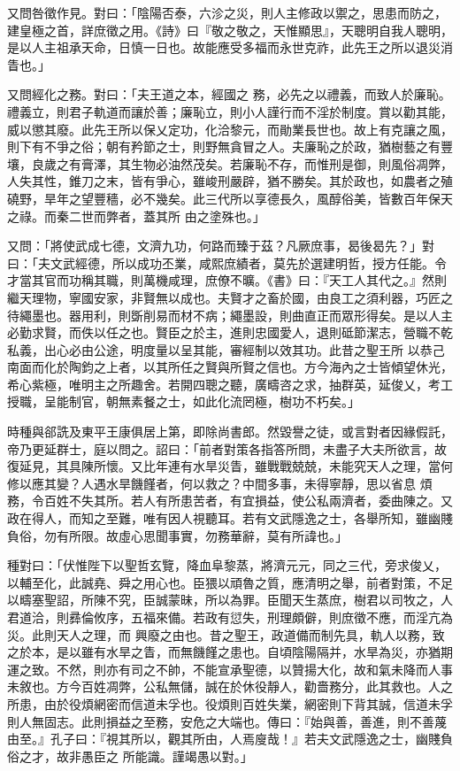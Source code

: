 \begin{pinyinscope}
 又問咎徵作見。對曰：「陰陽否泰，六沴之災，則人主修政以禦之，思患而防之，建皇極之首，詳庶徵之用。《詩》曰『敬之敬之，天惟顯思』，天聰明自我人聰明，是以人主祖承天命，日慎一日也。故能應受多福而永世克祚，此先王之所以退災消眚也。」



 又問經化之務。對曰：「夫王道之本，經國之
 務，必先之以禮義，而致人於廉恥。禮義立，則君子軌道而讓於善；廉恥立，則小人謹行而不淫於制度。賞以勸其能，威以懲其廢。此先王所以保乂定功，化洽黎元，而勛業長世也。故上有克讓之風，則下有不爭之俗；朝有矜節之士，則野無貪冒之人。夫廉恥之於政，猶樹藝之有豐壤，良歲之有膏澤，其生物必油然茂矣。若廉恥不存，而惟刑是御，則風俗凋弊，人失其性，錐刀之末，皆有爭心，雖峻刑嚴辟，猶不勝矣。其於政也，如農者之殖磽野，旱年之望豐穡，必不幾矣。此三代所以享德長久，風醇俗美，皆數百年保天之祿。而秦二世而弊者，蓋其所
 由之塗殊也。」



 又問：「將使武成七德，文濟九功，何路而臻于茲？凡厥庶事，曷後曷先？」對曰：「夫文武經德，所以成功丕業，咸熙庶績者，莫先於選建明哲，授方任能。令才當其官而功稱其職，則萬機咸理，庶僚不曠。《書》曰：『天工人其代之。』然則繼天理物，寧國安家，非賢無以成也。夫賢才之畜於國，由良工之須利器，巧匠之待繩墨也。器用利，則斲削易而材不病；繩墨設，則曲直正而眾形得矣。是以人主必勤求賢，而佚以任之也。賢臣之於主，進則忠國愛人，退則砥節潔志，營職不乾私義，出心必由公途，明度量以呈其能，審經制以效其功。此昔之聖王所
 以恭己南面而化於陶鈞之上者，以其所任之賢與所賢之信也。方今海內之士皆傾望休光，希心紫極，唯明主之所趣舍。若開四聰之聽，廣疇咨之求，抽群英，延俊乂，考工授職，呈能制官，朝無素餐之士，如此化流罔極，樹功不朽矣。」



 時種與郤詵及東平王康俱居上第，即除尚書郎。然毀譽之徒，或言對者因緣假託，帝乃更延群士，庭以問之。詔曰：「前者對策各指答所問，未盡子大夫所欲言，故復延見，其具陳所懷。又比年連有水旱災眚，雖戰戰兢兢，未能究天人之理，當何修以應其變？人遇水旱饑饉者，何以救之？中間多事，未得寧靜，思以省息
 煩務，令百姓不失其所。若人有所患苦者，有宜損益，使公私兩濟者，委曲陳之。又政在得人，而知之至難，唯有因人視聽耳。若有文武隱逸之士，各舉所知，雖幽賤負俗，勿有所限。故虛心思聞事實，勿務華辭，莫有所諱也。」



 種對曰：「伏惟陛下以聖哲玄覽，降血阜黎蒸，將濟元元，同之三代，旁求俊乂，以輔至化，此誠堯、舜之用心也。臣猥以頑魯之質，應清明之舉，前者對策，不足以疇塞聖詔，所陳不究，臣誠蒙昧，所以為罪。臣聞天生蒸庶，樹君以司牧之，人君道洽，則彞倫攸序，五福來備。若政有愆失，刑理頗僻，則庶徵不應，而淫亢為災。此則天人之理，而
 興廢之由也。昔之聖王，政道備而制先具，軌人以務，致之於本，是以雖有水旱之眚，而無饑饉之患也。自頃陰陽隔并，水旱為災，亦猶期運之致。不然，則亦有司之不帥，不能宣承聖德，以贊揚大化，故和氣未降而人事未敘也。方今百姓凋弊，公私無儲，誠在於休役靜人，勸嗇務分，此其救也。人之所患，由於役煩網密而信道未孚也。役煩則百姓失業，網密則下背其誠，信道未孚則人無固志。此則損益之至務，安危之大端也。傳曰：『始與善，善進，則不善蔑由至。』孔子曰：『視其所以，觀其所由，人焉廋哉！』若夫文武隱逸之士，幽賤負俗之才，故非愚臣之
 所能識。謹竭愚以對。」




\end{pinyinscope}
